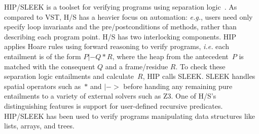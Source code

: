 
HIP/SLEEK is a toolset for verifying programs using separation logic~\cite{chin:hipsleek}.  As compared to VST, H/S has a heavier focus on automation: \emph{e.g.}, users need only specify loop invariants and the pre/postconditions of methods, rather than describing each program point.  H/S has two interlocking components.  HIP applies Hoare rules using forward reasoning to verify programs, \emph{i.e.} each entailment is of the form $P |- Q * R$, where the heap from the antecedent~$P$ is matched with the consequent $Q$ and a frame/residue $R$. To check these separation logic entailments and calculate~$R$, HIP calls SLEEK.  SLEEK handles spatial operators such as~$*$ and $|->$ before handing any remaining pure entailments to a variety of external solvers such as Z3.  One of H/S's distinguishing features is support for user-defined recursive predicates.  HIP/SLEEK has been used to verify programs manipulating data structures like lists, arrays, and trees.

